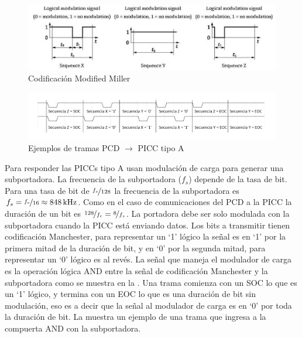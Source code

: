 \documentclass[a4paper, twoside, 11pt]{report}
\begin{document}
\begin{figure}[htb]
  \centering
  \includegraphics[scale=0.5]{./img/sequences}
  \caption{Codificación Modified Miller~\cite{iso14443-2}}
  \label{fig:sequences}
\end{figure}

\begin{figure}[htb]
  \centering
  \includegraphics[scale=0.45]{./img/rx_frame_examples}
  \caption{Ejemplos de tramas PCD $\rightarrow$ PICC tipo A}
  \label{fig:rx_frame_examples}
\end{figure}

\FloatBarrier

Para responder las PICCs tipo A usan modulación de carga para generar una subportadora.  La frecuencia de la subportadora ($f_s$) depende de la tasa de bit. Para una tasa de bit de $\nicefrac{f_c}{128}$ la frecuencia de la subportadora es $f_s = \nicefrac{f_c}{16} \approx \SI{848}{\kilo\hertz}$. Como en el caso de comunicaciones del PCD a la PICC la duración de un bit es $\nicefrac{128}{f_c} = \nicefrac{8}{f_s}$. La portadora debe ser solo modulada con la subportadora cuando la PICC está enviando datos. Los bits a transmitir tienen codificación Manchester, para representar un ‘1’ lógico la señal es en ‘1’ por la primera mitad de la duración de bit, y en ‘0’ por la segunda mitad, para representar un ‘0’ lógico es al revés. La señal que maneja el modulador de carga es la operación lógica AND entre la señal de codificación Manchester y la subportadora como se muestra en la . Una trama comienza con un SOC lo que es un ‘1’ lógico, y termina con un EOC lo que es una duración de bit sin modulación, eso es a decir que la señal al modulador de carga es en ‘0’ por toda la duración de bit. La  muestra un ejemplo de una trama que ingresa a la compuerta AND con la subportadora.
\end{document}
